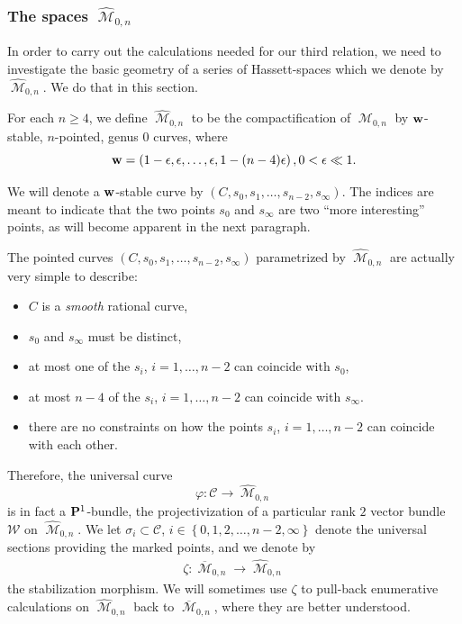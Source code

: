 \documentclass[12pt,reqno]{amsart}
\DeclareMathOperator{\M}{\mathcal{M}}
\renewcommand{\to}{{\longrightarrow}}
\numberwithin{equation}{section}
\newcommand{\cC}{\mathcal{C}}
\newcommand{\hM}{\widehat{\M}}
\begin{document}
\subsubsection{The spaces $\hM_{0,n}$}
\label{sec:spaces-hm_0-n}

In order to carry out the calculations needed for our third relation,
we need to investigate the basic geometry of a series of
Hassett-spaces which we denote by $\hM_{0,n}$.  We do that in this
section.

\begin{definition}
  \label{def:hM0n} For each $n \geq 4$, we define $\hM_{0,n}$ to be
  the compactification of $\M_{0,n}$ by ${\bf w}$-stable, $n$-pointed,
  genus $0$ curves, where
  $${\bf w} = \left(1- \epsilon, \epsilon, \dots, \epsilon, 1-(n-4)\epsilon \right), 0 < \epsilon \ll 1.$$
\end{definition}

We will denote a ${\bf w}$-stable curve by
$(C, s_{0}, s_{1}, \dots, s_{n-2}, s_{\infty})$.  The indices are
meant to indicate that the two points $s_{0}$ and $s_{\infty}$ are two
``more interesting'' points, as will become apparent in the next
paragraph.

The pointed curves $(C, s_{0}, s_{1}, \dots, s_{n-2}, s_{\infty})$
parametrized by $\hM_{0,n}$ are actually very simple to describe:

\begin{itemize}
\item $C$ is a {\sl smooth} rational curve,
\item $s_{0}$ and $s_{\infty}$ must be distinct,
\item at most one of the $s_{i}$, $i=1, \dots, n-2$ can coincide with
  $s_{0}$,
\item at most $n-4$ of the $s_{i}$, $i=1, \dots, n-2$ can coincide
  with $s_{\infty}$.
\item there are no constraints on how the points $s_{i}$,
  $i=1, \dots, n-2$ can coincide with each other.
\end{itemize}
Therefore, the universal curve $$\varphi: \cC \to \hM_{0,n}$$ is in
fact a $\P^{1}$-bundle, the projectivization of a particular rank $2$
vector bundle $\mathcal{W}$ on $\hM_{0,n}$. We let
$\sigma_{i} \subset \cC$,
$i \in \left\{0,1,2, \dots, n-2, \infty\right\}$ denote the universal
sections providing the marked points, and we denote by
\begin{align}
  \label{eq:stab}
  \zeta: \overline{\M}_{0,n} \to \hM_{0,n}
\end{align}
the stabilization morphism.  We will sometimes use $\zeta$ to
pull-back enumerative calculations on $\hM_{0,n}$ back to
$\overline{\M}_{0,n}$, where they are better understood.
\end{document}
